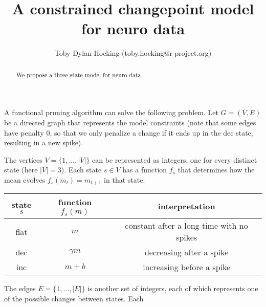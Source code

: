 \documentclass{article}
\begin{document}
\title{A constrained changepoint model for neuro data}
\author{
Toby Dylan Hocking (toby.hocking@r-project.org)
}
\maketitle

\begin{abstract}
We propose a three-state model for neuro data.
\end{abstract}

A functional pruning algorithm can solve the following problem. Let
$G=(V,E)$ be a directed graph that represents the model constraints
(note that some edges have penalty 0, so that we only penalize a change if it
ends up in the dec state, resulting in a new spike).
\begin{center}
\end{center}
The vertices $V=\{1,\dots,|V|\}$ can be represented as integers, one
for every distinct state (here $|V|=3$). Each state $s\in V$ has a
function $f_s$ that determines how the mean evolves
$f_s(m_t) = m_{t+1}$ in that state:
\begin{center}
  \begin{tabular}{ccc}
state $s$ &  function $f_s(m)$ & interpretation \\
  \hline
  flat & $m$ & constant after a long time with no spikes\\
dec & $\gamma m$ & decreasing after a spike\\
inc & $m+b$ & increasing before a spike
\end{tabular}
\end{center}
The edges $E=\{1,\dots,|E|\}$ is another set of integers, each of
which represents one of the possible changes between states. Each
\end{document}
